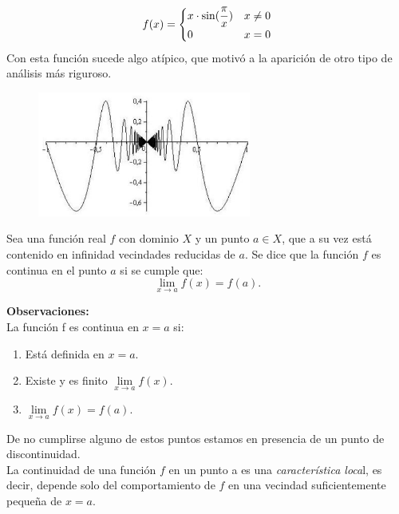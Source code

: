 \documentclass[10pt,twoside]{SelfArx} %
\begin{document}
\[ f(x)=\begin{cases}
x\cdot\sin(\dfrac{\pi}{x}) & \mbox{$ x\neq0 $}\\
0 & \mbox{$ x=0 $}
\end{cases} \]
Con esta funci\'on sucede algo atípico, que motivó a la aparición de otro tipo de análisis más riguroso.\\
\begin{figure}[h]
	\centering
	\includegraphics[width=7cm]{xsin_pix}
	\caption{}
	\label{xsin_pix}
\end{figure}

\begin{thm}\label{Continuidad_definicion_secilla}
	Sea una función real $ f $ con dominio $ X $ y un punto $ a\in X $, que a su vez está contenido en infinidad vecindades reducidas de $ a $. Se dice que la función $ f $ es continua en el punto $ a $ si se cumple que:
	\[ \lim\limits_{x\rightarrow a}f(x)=f(a). \]
\end{thm}


\textbf{Observaciones:}\\
La función f es continua en $ x=a $ si:\\
\begin{enumerate}
	\item Está definida en $ x=a $.
	\item Existe y es finito $ \lim\limits_{x\rightarrow a}f(x) $.
	\item $ \lim\limits_{x\rightarrow a}f(x)=f(a) $.
\end{enumerate}
De no cumplirse alguno de estos puntos estamos en presencia de un punto de discontinuidad.\\
 La continuidad de una función $ f $ en un punto a es una \textsl{característica loca}l, es decir,
 depende solo del comportamiento de $ f $ en una vecindad suficientemente pequeña de $ x=a $.
\end{document}

